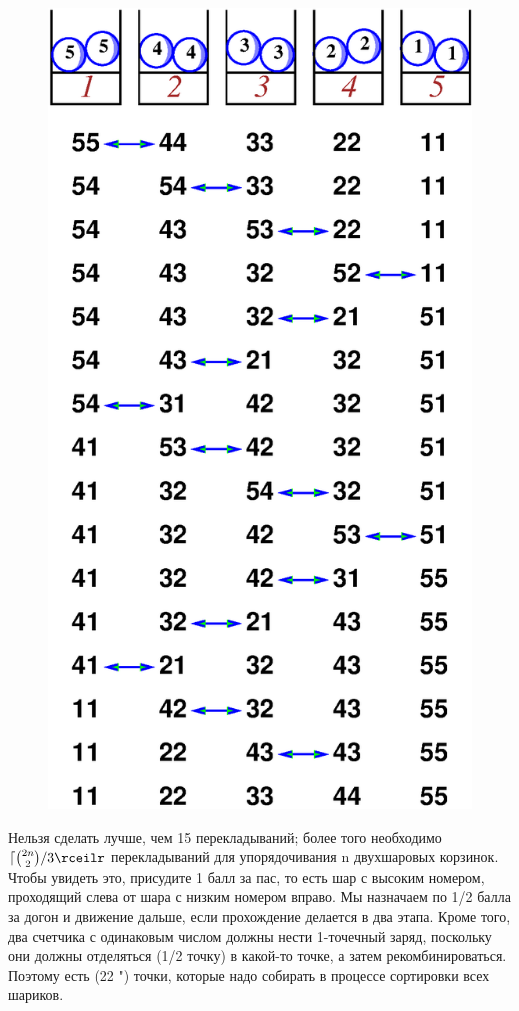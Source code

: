 \begin{figure}[h!]
\centering
\includegraphics[scale=0.5]{Figs/UnsolvedPuzzles/5bin}
\end{figure}

Нельзя сделать лучше, чем 15 перекладываний; более того необходимо $\lceil\binom{2n}{2}/3\rceilr$ перекладываний для упорядочивания n двухшаровых корзинок.
Чтобы увидеть это, присудите 1 балл за пас, то есть шар с высоким номером, проходящий слева от шара с низким номером вправо.
Мы назначаем по 1/2 балла за догон и движение дальше, если прохождение делается в два этапа.
Кроме того, два счетчика с одинаковым числом должны нести 1-точечный заряд, поскольку они должны отделяться (1/2 точку) в какой-то точке, а затем рекомбинироваться.
Поэтому есть (22 ") точки, которые надо собирать в процессе сортировки всех шариков.

